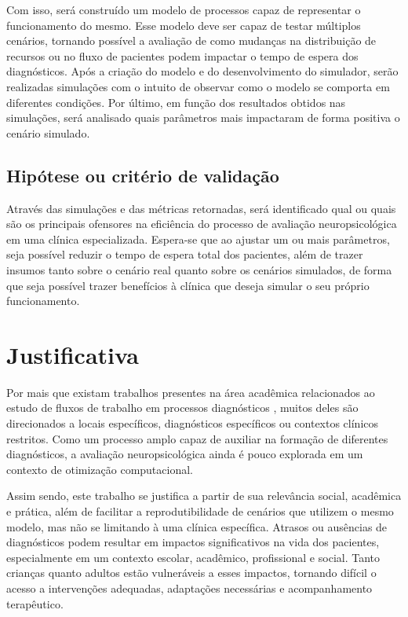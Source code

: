 \documentclass[
    12pt,
    openright,
    oneside,
    a4paper,
    english,
    brazil
]{abntex2}
\begin{document}
Com isso, será construído um modelo de processos capaz de representar o funcionamento do mesmo. Esse modelo deve ser capaz de testar múltiplos cenários, tornando possível a avaliação de como mudanças na distribuição de recursos ou no fluxo de pacientes podem impactar o tempo de espera dos diagnósticos. Após a criação do modelo e do desenvolvimento do simulador, serão realizadas simulações com o intuito de observar como o modelo se comporta em diferentes condições. Por último, em função dos resultados obtidos nas simulações, será analisado quais parâmetros mais impactaram de forma positiva o cenário simulado.

\subsection{Hipótese ou critério de validação}

Através das simulações e das métricas retornadas, será identificado qual ou quais são os principais ofensores na eficiência do processo de avaliação neuropsicológica em uma clínica especializada. Espera-se que ao ajustar um ou mais parâmetros, seja possível reduzir o tempo de espera total dos pacientes, além de trazer insumos tanto sobre o cenário real quanto sobre os cenários simulados, de forma que seja possível trazer benefícios à clínica que deseja simular o seu próprio funcionamento.

\section{Justificativa}

Por mais que existam trabalhos presentes na área acadêmica relacionados ao estudo de fluxos de trabalho em processos diagnósticos \cite{Galves2022,Silva2023}, muitos deles são direcionados a locais específicos, diagnósticos específicos ou contextos clínicos restritos. Como um processo amplo capaz de auxiliar na formação de diferentes diagnósticos, a avaliação neuropsicológica ainda é pouco explorada em um contexto de otimização computacional.

Assim sendo, este trabalho se justifica a partir de sua relevância social, acadêmica e prática, além de facilitar a reprodutibilidade de cenários que utilizem o mesmo modelo, mas não se limitando à uma clínica específica. Atrasos ou ausências de diagnósticos podem resultar em impactos significativos na vida dos pacientes, especialmente em um contexto escolar, acadêmico, profissional e social. Tanto crianças quanto adultos estão vulneráveis a esses impactos, tornando difícil o acesso a intervenções adequadas, adaptações necessárias e acompanhamento terapêutico.
\end{document}

